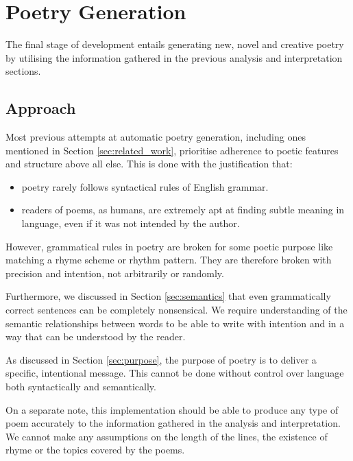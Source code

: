 \chapter{Poetry Generation}
\ifpdf
    \graphicspath{{Management/ManagementFigs/PNG/}{Management/ManagementFigs/PDF/}{Management/ManagementFigs/}}
\else
    \graphicspath{{Management/ManagementFigs/EPS/}{Management/ManagementFigs/}}
\fi

The final stage of development entails generating new, novel and creative poetry by utilising the information gathered in the previous analysis and interpretation sections.

\section{Approach}
Most previous attempts at automatic poetry generation, including ones mentioned in Section \ref{sec:related_work}, prioritise adherence to poetic features and structure above all else. This is done with the justification that:
\begin{itemize}
\item{poetry rarely follows syntactical rules of English grammar.}
\item{readers of poems, as humans, are extremely apt at finding subtle meaning in language, even if it was not intended by the author.}
\end{itemize}

However, grammatical rules in poetry are broken for some poetic purpose like matching a rhyme scheme or rhythm pattern. They are therefore broken with precision and intention, not arbitrarily or randomly.

Furthermore, we discussed in Section \ref{sec:semantics} that even grammatically correct sentences can be completely nonsensical. We require understanding of the semantic relationships between words to be able to write with intention and in a way that can be understood by the reader.

As discussed in Section \ref{sec:purpose}, the purpose of poetry is to deliver a specific, intentional message. This cannot be done without control over language both syntactically and semantically.

On a separate note, this implementation should be able to produce any type of poem accurately to the information gathered in the analysis and interpretation. We cannot make any assumptions on the length of the lines, the existence of rhyme or the topics covered by the poems.


